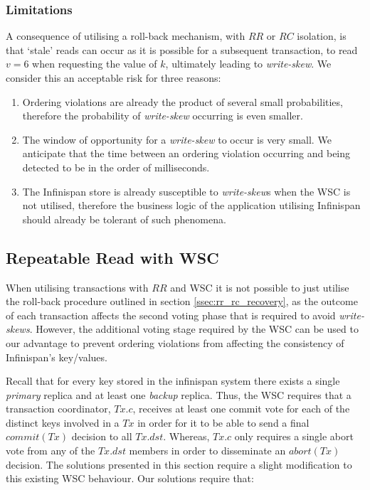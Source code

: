     \subsubsection*{Limitations}
    A consequence of utilising a roll-back mechanism, with $RR$ or $RC$ isolation, is that \textquoteleft{}stale' reads can occur as it is possible for a subsequent transaction, to read $v = 6$ when requesting the value of $k$, ultimately leading to \emph{write-skew}.  We consider this an acceptable risk for three reasons: 
    \begin{enumerate}[label=\roman*]
        \item    Ordering violations are already the product of several small probabilities, therefore the probability of \emph{write-skew} occurring is even smaller.  
        
        \item    The window of opportunity for a \emph{write-skew} to occur is very small.  We anticipate that the time between an ordering violation occurring and being detected to be in the order of milliseconds.   
        
        \item    The Infinispan store is already susceptible to \emph{write-skew}s when the WSC is not utilised, therefore the business logic of the application utilising Infinispan should already be tolerant of such phenomena.  
    \end{enumerate}    
    
    \subsection{Repeatable Read with WSC}\label{ssec:pscast_rr_wsc}
        
        When utilising transactions with $RR$ and WSC it is not possible to just utilise the roll-back procedure outlined in section \ref{ssec:rr_rc_recovery}, as the outcome of each transaction affects the second voting phase that is required to avoid \emph{write-skews}.  However, the additional voting stage required by the WSC can be used to our advantage to prevent ordering violations from affecting the consistency of Infinispan's key/values.  
        
        Recall that for every key stored in the infinispan system there exists a single \emph{primary} replica and at least one \emph{backup} replica.  Thus, the WSC requires that a transaction coordinator, $Tx.c$, receives at least one commit vote for each of the distinct keys involved in a $Tx$ in order for it to be able to send a final $commit(Tx)$ decision to all $Tx.dst$.  Whereas, $Tx.c$ only requires a single abort vote from any of the $Tx.dst$ members in order to disseminate an $abort(Tx)$ decision.  The solutions presented in this section require a slight modification to this existing WSC behaviour.  Our solutions require that: 

